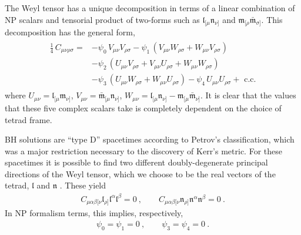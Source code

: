 The Weyl tensor has a unique decomposition in terms of a linear combination of NP scalars and tensorial product of two-forms such as $\mathfrak{l}_{[\mu} \mathfrak{n}_{\nu]}$ and $\mathfrak{m}_{[\rho} \bar{\mathfrak{m}}_{\sigma]}$.
This decomposition has the general form,
\begin{align}
    \begin{split}
    \frac{1}{4} \, C_{\mu\nu\rho\sigma} = & - \psi_0 \,V_{\mu\nu} V_{\rho\sigma} - \psi_1 \, (V_{\mu\nu} W_{\rho\sigma} + W_{\mu\nu} V_{\rho\sigma}) \\
    & - \psi_2 \, (U_{\mu\nu}V_{\rho\sigma} + V_{\mu\nu}U_{\rho\sigma} + W_{\mu\nu}W_{\rho\sigma}) \\
    & - \psi_3 \, (U_{\mu\nu}W_{\rho\sigma} + W_{\mu\nu}U_{\rho\sigma})
    - \psi_4 \, U_{\mu\nu}U_{\rho\sigma} + \text{ c.c.}
    \end{split}
\end{align}
where $U_{\mu\nu} = \mathfrak{l}_{[\mu} \mathfrak{m}_{\nu]}$, $V_{\mu\nu} = \bar{\mathfrak{m}}_{[\mu} \mathfrak{n}_{\nu]}$, $W_{\mu\nu} = \mathfrak{l}_{[\mu} \mathfrak{n}_{\nu]} - \mathfrak{m}_{[\mu} \bar{\mathfrak{m}}_{\nu]}$.
It is clear that the values that these five complex scalars take is completely dependent on the choice of tetrad frame. 

BH solutions are ``type D'' spacetimes according to Petrov's classification, which was a major restriction necessary to the discovery of Kerr's metric.
For these spacetimes it is possible to find two different doubly-degenerate principal directions of the Weyl tensor, which we choose to be the real vectors of the tetrad, $\bm{\mathfrak{l}}$ and $\bm{\mathfrak{n}}$ \cite{Chandrasekhar1998}.
These yield
\begin{align}
    C_{\mu\alpha\beta[\nu} \mathfrak{l}_{\rho]} \mathfrak{l}^\alpha \mathfrak{l}^\beta = 0 ~, \qquad C_{\mu\alpha\beta[\nu} \mathfrak{n}_{\rho]} \mathfrak{n}^\alpha \mathfrak{n}^\beta = 0  ~.
\end{align}
In NP formalism terms, this implies, respectively,
\begin{align}
    \psi_0=\psi_1=0 ~,\qquad \psi_3=\psi_4=0 ~.
\end{align}


